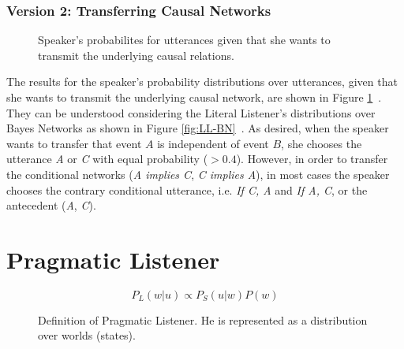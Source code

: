 \FloatBarrier
\subsubsection*{Version 2: Transferring Causal Networks}

\begin{figure}[htp]
\qquad
{}\qquad
{}
\caption{Speaker's probabilites for utterances given that she wants to transmit the underlying causal relations.}
\label{fig:speaker-bns}
\end{figure}

The results for the speaker's probability distributions over utterances, given that she wants to transmit the underlying causal network, are shown in Figure \ref{fig:speaker-bns}~. They can be understood considering the Literal Listener's distributions over Bayes Networks as shown in Figure \ref{fig:LL-BN}~. As desired, when the speaker wants to transfer that event $A$ is independent of event $B$, she chooses the utterance \textit{A} or \textit{C} with equal probability ($>0.4$). However, in order to transfer the conditional networks (\textit{A implies C}, \textit{C implies A}), in most cases the speaker chooses the contrary conditional utterance, i.e. \textit{If C, A} and \textit{If A, C}, or the antecedent (\textit{A}, \textit{C}).  


\FloatBarrier
\section*{Pragmatic Listener}

\begin{figure}[htp]
\begin{equation}
P_L (w|u) \propto P_S (u|w) P(w)
\end{equation}
\caption{Definition of Pragmatic Listener. He is represented as a distribution over worlds (states).}
\label{eq:pragmaticListener}
\end{figure}

